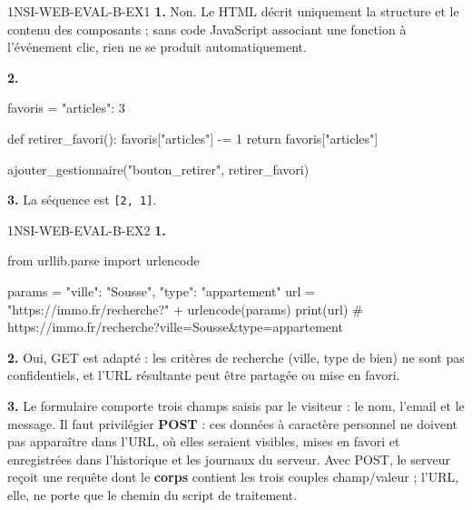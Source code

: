 \begin{corrige}{1NSI-WEB-EVAL-B-EX1}
\textbf{1.} Non. Le HTML décrit uniquement la structure et le contenu des composants ; sans code
JavaScript associant une fonction à l'événement clic, rien ne se produit automatiquement.

\textbf{2.}
\begin{python}
favoris = {"articles": 3}

def retirer_favori():
    favoris["articles"] -= 1
    return favoris["articles"]

ajouter_gestionnaire("bouton_retirer", retirer_favori)
\end{python}

\textbf{3.} La séquence est \lstinline{[2, 1]}.
\end{corrige}

\begin{corrige}{1NSI-WEB-EVAL-B-EX2}
\textbf{1.}
\begin{python}
from urllib.parse import urlencode

params = {"ville": "Sousse", "type": "appartement"}
url = "https://immo.fr/recherche?" + urlencode(params)
print(url)
# https://immo.fr/recherche?ville=Sousse&type=appartement
\end{python}

\textbf{2.} Oui, GET est adapté : les critères de recherche (ville, type de bien) ne sont
pas confidentiels, et l'URL résultante peut être partagée ou mise en favori.

\textbf{3.} Le formulaire comporte trois champs saisis par le visiteur : le nom, l'email
et le message. Il faut privilégier \textbf{POST} : ces données à caractère personnel ne
doivent pas apparaître dans l'URL, où elles seraient visibles, mises en favori et
enregistrées dans l'historique et les journaux du serveur. Avec POST, le serveur reçoit
une requête dont le \textbf{corps} contient les trois couples champ/valeur ; l'URL, elle,
ne porte que le chemin du script de traitement.
\end{corrige}

